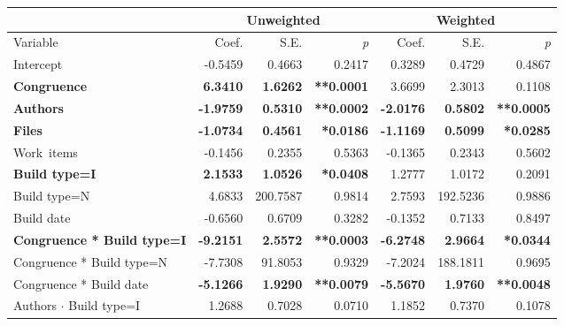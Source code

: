 \begin{table}[t]
\begin{center}
\small
\begin{tabular}{l|r@{\hspace{5pt}}r@{\hspace{-5pt}}r|r@{\hspace{5pt}}r@{\hspace{-5pt}}r}
 & \multicolumn{3}{c|}{Unweighted} & \multicolumn{3}{c}{Weighted} \\\hline
Variable & Coef. & S.E. & \emph{p} & Coef. & S.E. & \emph{p} \\
	\hline
Intercept                   &  -0.5459 &   0.4663 & 0.2417 &    0.3289 &    0.4729 &   0.4867 \\
\textbf{Congruence}              &   \textbf{6.3410} &   \textbf{1.6262} & \textbf{**0.0001} &    3.6699 &    2.3013 &   0.1108 \\
\textbf{Authors}                     &  \textbf{-1.9759} &   \textbf{0.5310} & \textbf{**0.0002} &   \textbf{-2.0176} &    \textbf{0.5802} &   \textbf{**0.0005} \\
\textbf{Files}                       &  \textbf{-1.0734} &   \textbf{0.4561} & \textbf{*0.0186} &   \textbf{-1.1169} &    \textbf{0.5099} &   \textbf{*0.0285} \\
Work~items                   &  -0.1456 &   0.2355 & 0.5363 &   -0.1365 &    0.2343 &   0.5602 \\
\textbf{Build type=I}                      &   \textbf{2.1533} &   \textbf{1.0526} & \textbf{*0.0408} &    1.2777 &    1.0172 &   0.2091 \\
Build type=N                      &   4.6833 & 200.7587 & 0.9814 &    2.7593 &  192.5236 &   0.9886 \\
Build date                   &  -0.6560 &   0.6709 & 0.3282 &   -0.1352 &    0.7133 &   0.8497 \\
\textbf{Congruence * Build type=I}     &  \textbf{-9.2151} &   \textbf{2.5572} & \textbf{**0.0003} &   \textbf{-6.2748} &    \textbf{2.9664} &   \textbf{*0.0344} \\
Congruence * Build type=N     &  -7.7308 &  91.8053 & 0.9329 &   -7.2024 &  188.1811 &   0.9695 \\
Congruence * Build date  &  \textbf{-5.1266} &   \textbf{1.9290} & \textbf{**0.0079} &   \textbf{-5.5670} &    \textbf{1.9760} &   \textbf{**0.0048} \\
Authors $\cdot$ Build type=I            &   1.2688 &   0.7028 & 0.0710 &    1.1852 &    0.7370 &   0.1078 \\

\end{tabular}
\end{center}
\end{table}
